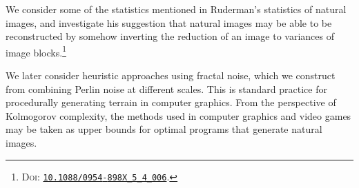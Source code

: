 \documentclass[../notebook.tex]{subfiles}
\begin{document}

We consider some of the statistics mentioned in Ruderman's statistics of natural
images, and investigate his suggestion that natural images may be able to be
reconstructed by somehow inverting the reduction of an image to variances of
image blocks.\footnote{\textsc{Doi}:
\href{https://doi.org/10.1088/0954-898X_5_4_006}{\texttt{10.1088/0954{-}898X\_5\_4\_006}}.}

We later consider heuristic approaches using fractal noise, which we construct
from combining Perlin noise at different scales. This is standard practice for
procedurally generating terrain in computer graphics. From the perspective of
Kolmogorov complexity, the methods used in computer graphics and video games may
be taken as upper bounds for optimal programs that generate natural images.


\end{document}
